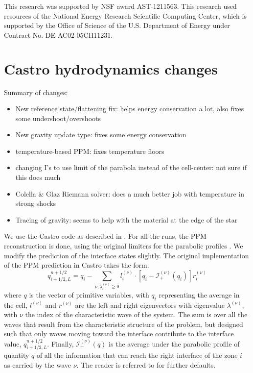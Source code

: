 \documentclass[12pt,preprint]{aastex}
\begin{document}
\acknowledgments

This research was supported by NSF award AST-1211563.
This research used resources of the National Energy Research
Scientific Computing Center, which is supported by the Office of
Science of the U.S. Department of Energy under Contract
No. DE-AC02-05CH11231.


\clearpage





\clearpage
\appendix

\section{Castro hydrodynamics changes}

Summary of changes:
\begin{itemize}
\item New reference state/flattening fix: helps energy conservation a
  lot, also fixes some undershoot/overshoots

\item New gravity update type: fixes some energy conservation

\item temperature-based PPM: fixes temperature floors

\item changing I's to use limit of the parabola instead of the
  cell-center: not sure if this does much

\item Colella \& Glaz Riemann solver: does a much better job with
  temperature in strong shocks

\item Tracing of gravity: seems to help with the material at the edge
  of the star
\end{itemize}

We use the Castro code as described in \citet{castro}.  For all the
runs, the PPM reconstruction is done, using the original limiters for
the parabolic profiles \citep{ppm}.  We modify the prediction of the
interface states slightly.  The original implementation of the PPM
prediction in Castro takes the form:
\begin{equation}
q_{i+1/2,L}^{n+1/2} = q_i -
   \sum_{\nu;\lambda_i^{(\nu)}\ge 0} l_i^{(\nu)} \cdot \left [
        q_i - \mathcal{I}_+^{(\nu)}(q_i)
       \right ] r_i^{(\nu)}
\end{equation}
where $q$ is the vector of primitive variables, with $q_i$
representing the average in the cell, $l^{(\nu)}$ and $r^{(\nu)}$ are
the left and right eigenvectors with eigenvalue $\lambda^{(\nu)}$,
with $\nu$ the index of the characteristic wave of the system.  The
sum is over all the waves that result from the characteristic
structure of the problem, but designed such that only waves moving
toward the interface contribute to the interface value,
$q_{i+1/2,L}^{n+1/2}$.  Finally, $\mathcal{I}_+^{(\nu)}(q)$ is the
average under the parabolic profile of quantity $q$ of all the information
that can reach the right interface of the zone $i$ as carried by the wave
$\nu$.   The reader is referred to
\citet{ppmunsplit} for further defaults.
\end{document}
